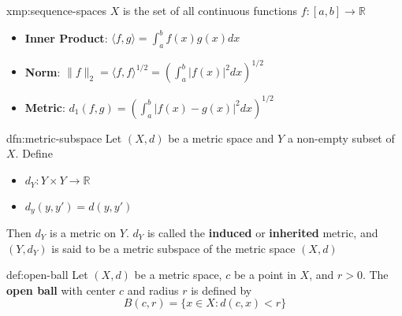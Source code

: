 \documentclass[landscape, 8pt]{extarticle}
\begin{document}
\begin{multicols}{3}
\begin{xmp}{xmp:sequence-spaces}{}
    $X$ is the set of all continuous functions $f : [a, b] \to \mathbb{R}$
    \vspace{-3pt}
    \begin{itemize}
        \item \textbf{Inner Product}: $\langle f, g \rangle = \int_{a}^{b} f(x)g(x) dx$
        \item \textbf{Norm}: $\lVert f \rVert_{2} = \langle f, f \rangle^{1 /2} = \left(\int_{a}^{b} \lvert f(x) \rvert^{2} dx\right)^{1 /2}$
        \item \textbf{Metric}: $d_{1}(f, g) = \left(\int_{a}^{b} \lvert f(x) - g(x) \rvert^{2} dx\right)^{1 /2}$
    \end{itemize}
\end{xmp}

\begin{dfn}{dfn:metric-subspace}{}
    Let $(X, d)$ be a metric space and $Y$ a non-empty subset of $X$. Define
    \begin{itemize}
        \item $d_{Y} : Y \times Y \to \mathbb{R}$
        \item $d_{y}(y, y') = d(y, y')$
    \end{itemize}

    Then $d_{Y}$ is a metric on $Y$. $d_{Y}$ is called the \textbf{induced} or \textbf{inherited} metric, and $(Y, d_{Y})$ is said to be a metric subspace of the metric space $(X, d)$
\end{dfn}


\begin{dfn}{def:open-ball}{}
    Let $(X, d)$ be a metric space, $c$ be a point in $X$, and $r > 0$. The \textbf{open ball} with center $c$ and radius $r$ is defined by
    \[B(c,r) = \{x\in X: d(c,x) < r\}\]
\end{dfn}

\newpage




%
%
%
%
%


\end{multicols}
\end{document}
